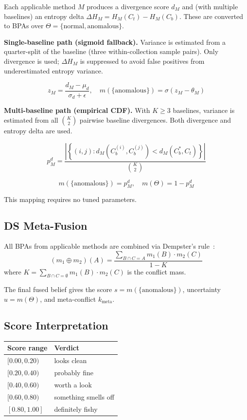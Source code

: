 \documentclass[10pt,twocolumn]{article}
\begin{document}
Each applicable method $M$ produces a divergence score $d_M$ and (with multiple baselines) an entropy delta $\Delta H_M = H_M(C_t) - H_M(C_b)$. These are converted to BPAs over $\Theta = \{\text{normal}, \text{anomalous}\}$.

\textbf{Single-baseline path (sigmoid fallback).} Variance is estimated from a quarter-split of the baseline (three within-collection sample pairs). Only divergence is used; $\Delta H_M$ is suppressed to avoid false positives from underestimated entropy variance.

\[
z_M = \frac{d_M - \mu_d}{\sigma_d + \epsilon}, \quad m(\{\text{anomalous}\}) = \sigma(z_M - \theta_M)
\]

\textbf{Multi-baseline path (empirical CDF).} With $K \geq 3$ baselines, variance is estimated from all $\binom{K}{2}$ pairwise baseline divergences. Both divergence and entropy delta are used.

\[
p_M^d = \frac{\left|\left\{(i,j) : d_M(C_b^{(i)}, C_b^{(j)}) < d_M(C_b^*, C_t)\right\}\right|}{\binom{K}{2}}
\]

\[
m(\{\text{anomalous}\}) = p_M^d, \quad m(\Theta) = 1 - p_M^d
\]

This mapping requires no tuned parameters.

\subsection{DS Meta-Fusion}

All BPAs from applicable methods are combined via Dempster's rule~\cite{dempster1968,shafer1976}:
\[
(m_1 \oplus m_2)(A) = \frac{\sum_{B \cap C = A} m_1(B) \cdot m_2(C)}{1 - K}
\]
where $K = \sum_{B \cap C = \emptyset} m_1(B) \cdot m_2(C)$ is the conflict mass.

The final fused belief gives the score $s = m(\{\text{anomalous}\})$, uncertainty $u = m(\Theta)$, and meta-conflict $k_{\text{meta}}$.

\subsection{Score Interpretation}

\begin{center}
\begin{tabular}{ll}
\toprule
Score range & Verdict \\
\midrule
$[0.00, 0.20)$ & looks clean \\
$[0.20, 0.40)$ & probably fine \\
$[0.40, 0.60)$ & worth a look \\
$[0.60, 0.80)$ & something smells off \\
$[0.80, 1.00]$ & definitely fishy \\
\bottomrule
\end{tabular}
\end{center}
\end{document}
